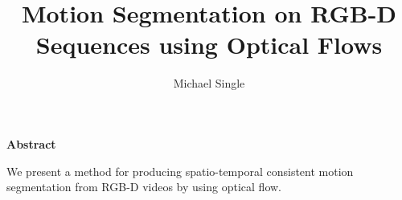\documentclass[a4paper]{report}
\begin{document}
\title{Motion Segmentation on RGB-D Sequences using Optical Flows}
\author{Michael Single}

 \setcounter{page}{1}
\maketitle

\newpage
\thispagestyle{empty}
\vspace{8cm}
\noindent
{\centerline {\bf \large Abstract}}
\vspace{1cm}


\noindent

We present a method for producing spatio-temporal consistent motion segmentation from RGB-D videos by using optical flow. 


 \setcounter{page}{1}
\tableofcontents

\newpage{\pagestyle{empty} \cleardoublepage}

 \setcounter{page}{1}
\pagestyle{fancy}


\newpage{\pagestyle{empty} \cleardoublepage}


\newpage{\pagestyle{empty} \cleardoublepage}


\newpage{\pagestyle{empty} \cleardoublepage}


\newpage{\pagestyle{empty} \cleardoublepage}


\newpage{\pagestyle{empty} \cleardoublepage}

\begin{appendix}

\newpage{\pagestyle{empty} \cleardoublepage}

\newpage{\pagestyle{empty} \cleardoublepage}
\end{appendix}

\listoftables

\listoffigures

\listofalgorithms


\nocite{*}



\end{document}
